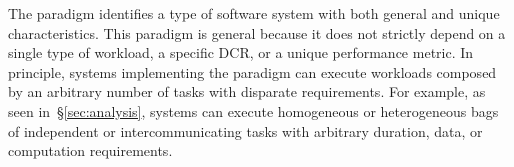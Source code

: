 \documentclass{sig-alternate}
\begin{document}


The \pilot paradigm identifies a type of software system with both general and
unique characteristics. This paradigm is general because it does not strictly
depend on a single type of workload, a specific DCR, or a unique performance
metric. In principle, systems implementing the \pilot paradigm can execute
workloads composed by an arbitrary number of tasks with disparate requirements.
For example, as seen in~\S\ref{sec:analysis}, \pilot systems can execute
homogeneous or heterogeneous bags of independent or intercommunicating tasks
with arbitrary duration, data, or computation requirements.

\end{document}
